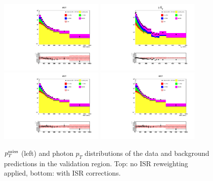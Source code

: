 \documentclass[thesis.tex]{subfiles}
\renewcommand\_{\textunderscore\allowbreak}
\begin{document}
\begin{figure}[hbtp]
  \centering
    \includegraphics[width=0.45\textwidth]{Figures/VALIDNOCOR_mg_2016ReMiniAOD_met.pdf}
    \includegraphics[width=0.45\textwidth]{Figures/VALIDNOCOR_mg_2016ReMiniAOD_pt.pdf} \\
    \includegraphics[width=0.45\textwidth]{Figures/VALID_mg_2016ReMiniAOD_met.pdf}
    \includegraphics[width=0.45\textwidth]{Figures/VALID_mg_2016ReMiniAOD_met.pdf}
  \caption{$p_T^\textrm{miss}$ (left) and photon $p_T$ distributions of the data and background predictions in the validation region. Top: no ISR reweighting applied, bottom: with ISR corrections. }
  \label{fig:apen-withcorr}
\end{figure}
\end{document}
